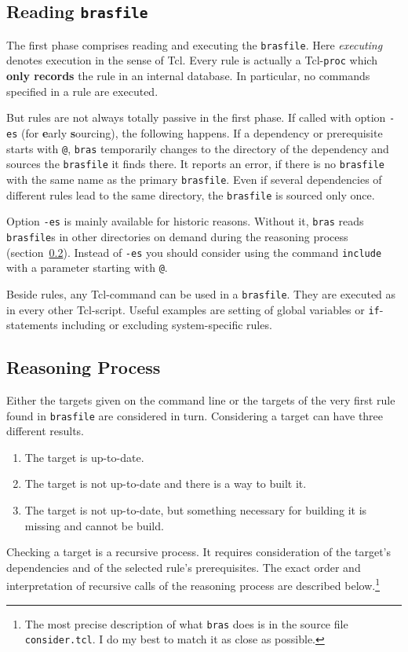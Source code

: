\documentclass[12pt]{article}
\newcommand{\bras}{\texttt{bras}}
\begin{document}
\subsection{Reading \texttt{brasfile}}
The first phase comprises reading and executing the
\texttt{brasfile}. Here \textit{executing} 
denotes execution in the sense of Tcl. Every rule is actually a
Tcl-\texttt{proc} which \textbf{only records} the rule in an internal
database. In particular, no commands specified in a rule are
executed. 

But rules are not always totally passive in the first phase. 
If called with option \texttt{-es} (for \textbf{e}arly
\textbf{s}ourcing), the following happens.
If a dependency or prerequisite starts with \texttt{@}, \bras{}
temporarily changes to the directory of the dependency and sources the
\texttt{brasfile} it finds there. It reports an error, if there is no
\texttt{brasfile} with the same name as the primary
\texttt{brasfile}. Even if several dependencies of different rules lead
to the same directory, the \texttt{brasfile} is sourced only once.

Option \texttt{-es} is mainly available for historic reasons. Without
it, \bras{} reads \texttt{brasfile}s in other directories on demand
during the reasoning process (section~\ref{secReasoning}). Instead of
\texttt{-es} you should consider using the command \texttt{include}
with a parameter starting with \texttt{@}.

Beside rules, any Tcl-command can be used in a \texttt{brasfile}. They
are executed as in every other Tcl-script. Useful examples are setting
of global variables or \texttt{if}-statements including or excluding
system-specific rules.

\subsection{Reasoning Process}
\label{secReasoning}
Either the targets given on the command line or the targets of the
very first rule found in \texttt{brasfile} are considered in
turn. Considering a target can have three different results. 
\begin{enumerate}
\item
The target is up-to-date.
\item
The target is not up-to-date and there is a way to built it.
\item
The target is not up-to-date, but something necessary for building it
is missing and cannot be build.
\end{enumerate}
Checking a target is a recursive process. It requires consideration of
the target's dependencies and of the selected rule's
prerequisites. The exact order and interpretation of recursive calls
of the reasoning process are described below.\footnote{The most
precise description of what \bras{} does is in the
source file \texttt{consider.tcl}. I do my best to match it as close
as possible.}
\end{document}
